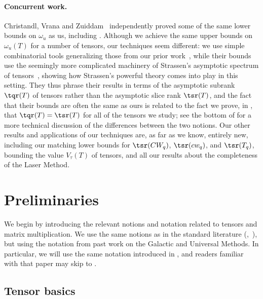 \documentclass{toc}
\begin{document}
%
\paragraph{Concurrent work.} Christandl, Vrana and Zuiddam~\cite{theirpreprint} independently proved some of the same lower bounds on $\omega_u$ as us, including .
Although we achieve the same upper bounds on $\omega_u(T)$ for a number of tensors, our techniques seem different: we use simple combinatorial tools generalizing those from our prior work~\cite{aw}, 
while their bounds use the seemingly more complicated machinery of Strassen's asymptotic spectrum of tensors~\cite{strassen1991degeneration}, showing how Strassen's powerful theory comes into play in this setting. They thus phrase their results in terms of the asymptotic subrank $\tqr(T)$ of tensors rather than the asymptotic slice rank $\tsr(T)$, and the fact that their bounds are often the same as ours is related to the fact we prove, in , that $\tqr(T) = \tsr(T)$ for all of the tensors we study; see the bottom of  for a more technical discussion of the differences between the two notions. Our other results and applications of our techniques are, as far as we know, entirely new, including our matching lower bounds for $\tsr(CW_q)$, $\tsr(cw_q)$, and $\tsr(T_q)$, bounding the value $V_\tau(T)$ of tensors, and all our results about the completeness of the Laser Method.





\section{Preliminaries} \label{sectwo}

We begin by introducing the relevant notions and notation related to tensors and matrix multiplication. We use the same notions as in the standard literature (\eg,~\cite{laser,blaser,burgisser2013algebraic}), but using the notation from past work on the Galactic and Universal Methods. In particular, we will use the same notation introduced in \cite[Section~3]{aw}, and readers familiar with that paper may skip to .

%
\subsection{Tensor basics}
\end{document}
